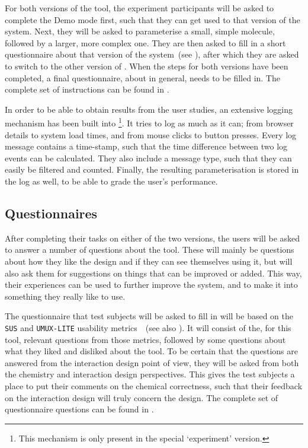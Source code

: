 For both versions of the tool, the experiment participants will be asked to complete the Demo mode first, such that they can get used to that version of the system. Next, they will be asked to parameterise a small, simple molecule, followed by a larger, more complex one. They are then asked to fill in a short questionnaire about that version of the system~(see ), after which they are asked to switch to the other version of \oframp. When the steps for both versions have been completed, a final questionnaire, about \oframp{} in general, needs to be filled in. The complete set of instructions can be found in .

In order to be able to obtain results from the user studies, an extensive logging mechanism has been built into \oframp\footnote{This mechanism is only present in the special `experiment' version.}. It tries to log as much as it can; from browser details to system load times, and from mouse clicks to button presses. Every log message contains a time-stamp, such that the time difference between two log events can be calculated. They also include a message type, such that they can easily be filtered and counted. Finally, the resulting parameterisation is stored in the log as well, to be able to grade the user's performance.


\subsection{Questionnaires}
After completing their tasks on either of the two versions, the users will be asked to answer a number of questions about the tool. These will mainly be questions about how they like the design and if they can see themselves using it, but will also ask them for suggestions on things that can be improved or added. This way, their experiences can be used to further improve the system, and to make it into something they really like to use.

The questionnaire that test subjects will be asked to fill in will be based on the \verb|SUS| and \verb|UMUX-LITE| usability metrics~\cite{lewis2013umux}~(see also ). It will consist of the, for this tool, relevant questions from those metrics, followed by some questions about what they liked and disliked about the tool. To be certain that the questions are answered from the interaction design point of view, they will be asked from both the chemistry and interaction design perspectives. This gives the test subjects a place to put their comments on the chemical correctness, such that their feedback on the interaction design will truly concern the design. The complete set of questionnaire questions can be found in .

